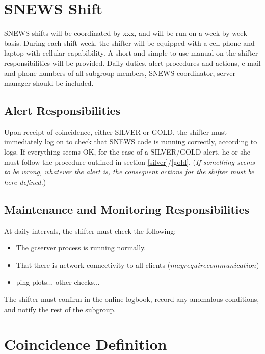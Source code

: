 \documentclass{article}
\begin{document}
\section{SNEWS Shift}

SNEWS shifts will be coordinated by xxx, and will be run on
a week by week basis.  During each shift week, the shifter will
be equipped with a cell phone and laptop with cellular
capabibility. A short and simple to use manual on the shifter 
responsibilities will be provided. Daily duties, alert procedures and
actions, e-mail and phone numbers of all subgroup members, SNEWS
coordinator, server manager should be included.

\subsection{Alert Responsibilities}

Upon receipt of coincidence, either SILVER or GOLD, the shifter
must immediately log on to check that SNEWS code is running
correctly, according to logs.  If everything seems OK, for 
the case of a SILVER/GOLD  alert, he or she must follow the procedure
outlined in section \ref{silver}/\ref{gold}.
({\it If something seems to be wrong, whatever the alert is, the consequent  
actions for the shifter must be here defined.})

\subsection{Maintenance and Monitoring Responsibilities}

At daily intervals, the shifter must check the following:

\begin{itemize}
\item The gcserver process is running normally.
\item That there is network connectivity to all clients ($ may
require communication $)
\item ping plots... other checks...

\end{itemize}

The shifter must confirm in the online logbook, record any
anomalous conditions, and notify the rest of the subgroup.



\section{Coincidence Definition}
\end{document}
